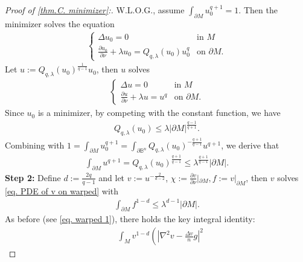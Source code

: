 \documentclass[12pt]{amsart}%
\numberwithin{equation}{section}
\numberwithin{lemma}{section}
\numberwithin{proposition}{section}
\numberwithin{corollary}{section}
\numberwithin{remark}{section}
\begin{document}
\begin{proof}[Proof of \cref{thm.C. minimizer}:]
            W.L.O.G., assume $\int_{\partial M}u_0^{q+1}=1$. Then the minimizer solves the equation
            \begin{align*}
                \begin{cases}
                    \Delta u_0=0 &\text{in }M\\
                    \frac{\partial u_0}{\partial \nu}+\lambda u_0=Q_{q,\lambda}(u_0)u_0^q
                     &\text{on }\partial M.
                \end{cases}
            \end{align*}
            Let $u:=Q_{q,\lambda}(u_0)^{\frac{1}{q-1}}u_0 $, then $u$ solves
            \begin{align*}
                \begin{cases}
                    \Delta u=0&\text{in }M\\
                    \frac{\partial u}{\partial \nu}+\lambda u=u^q
                     &\text{on }\partial M.
                \end{cases}
            \end{align*}
            Since $u_0$ is a minimizer, by competing with the constant function,  we have
            \begin{align*}
                Q_{q,\lambda}(u_0)\leq
                \lambda |\partial M|^{\frac{q-1}{q+1}}.
            \end{align*}
            Combining with $1=\int_{\partial M}u_0^{q+1}            =\int_{\partial\mathbb{B}^n}Q_{q,\lambda}(u_0)^{-\frac{q+1}{q-1}}u^{q+1} $, we derive that
            \begin{align*}
                \int_{\partial M}u^{q+1}
                =Q_{q,\lambda}(u_0)^{\frac{q+1}{q-1}}
                \leq \lambda^{\frac{q+1}{q-1}}
                |\partial M|.
            \end{align*}
            \textbf{Step 2:} Define $d:=\frac{2q}{q-1}$ and let $v:=u^{-\frac{2}{d-2}}$, $\chi:=\frac{\partial v}{\partial \nu}|_{\partial M}, f:=v|_{\partial M} $, then $v$ solves \cref{eq. PDE of v on warped}
        with 
        \begin{align}\label{ineq. integral hypothesis}
            \int_{\partial M}f^{1-d}
            \leq \lambda^{d-1}|\partial M|.
        \end{align}
        As before (see  \cref{eq. warped 1}), there holds the key integral identity:
        \begin{align}\label{eq. 1 in warped case}
            &\int_{M}v^{1-d}\left(
        \left|\nabla^2 v-\frac{\Delta v}{n}g\right|^2

\end{align}
\end{proof}
\end{document}
